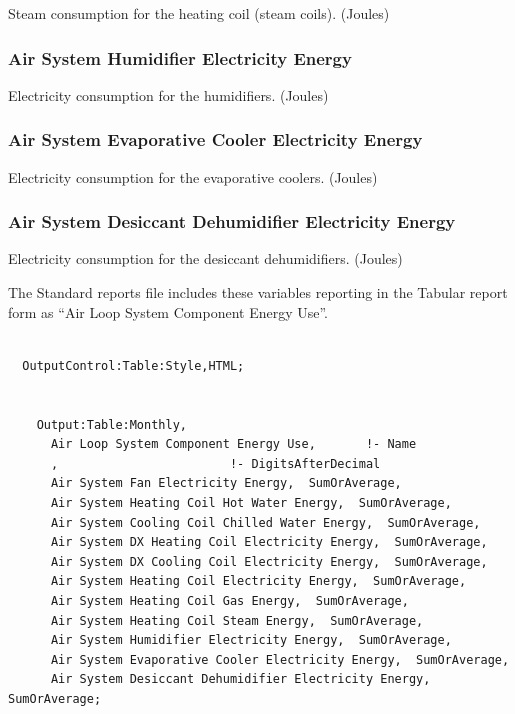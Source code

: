 Steam consumption for the heating coil (steam coils). (Joules)

\subsubsection{Air System Humidifier Electricity Energy}\label{air-system-humidifier-electric-energy}

Electricity consumption for the humidifiers. (Joules)

\subsubsection{Air System Evaporative Cooler Electricity Energy}\label{air-system-evaporative-cooler-electric-energy}

Electricity consumption for the evaporative coolers. (Joules)

\subsubsection{Air System Desiccant Dehumidifier Electricity Energy}\label{air-system-desiccant-dehumidifier-electric-energy}

Electricity consumption for the desiccant dehumidifiers. (Joules)

The Standard reports file includes these variables reporting in the Tabular report form as ``Air Loop System Component Energy Use''.

\begin{lstlisting}

  OutputControl:Table:Style,HTML;


    Output:Table:Monthly,
      Air Loop System Component Energy Use,       !- Name
      ,                        !- DigitsAfterDecimal
      Air System Fan Electricity Energy,  SumOrAverage,
      Air System Heating Coil Hot Water Energy,  SumOrAverage,
      Air System Cooling Coil Chilled Water Energy,  SumOrAverage,
      Air System DX Heating Coil Electricity Energy,  SumOrAverage,
      Air System DX Cooling Coil Electricity Energy,  SumOrAverage,
      Air System Heating Coil Electricity Energy,  SumOrAverage,
      Air System Heating Coil Gas Energy,  SumOrAverage,
      Air System Heating Coil Steam Energy,  SumOrAverage,
      Air System Humidifier Electricity Energy,  SumOrAverage,
      Air System Evaporative Cooler Electricity Energy,  SumOrAverage,
      Air System Desiccant Dehumidifier Electricity Energy,  SumOrAverage;
\end{lstlisting}

